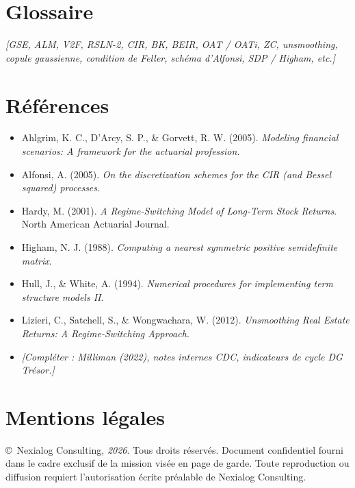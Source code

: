 \documentclass[11pt,a4paper]{article}
\newcommand{\ph}[1]{\textcolor{nxgray}{\itshape #1}}
\begin{document}
\section{Glossaire}
\ph{[GSE, ALM, V2F, RSLN-2, CIR, BK, BEIR, OAT / OATi, ZC, unsmoothing, copule gaussienne, condition de Feller, schéma d'Alfonsi, SDP / Higham, etc.]}

\section{Références}
\begin{itemize}
  \item Ahlgrim, K. C., D'Arcy, S. P., \& Gorvett, R. W. (2005). \textit{Modeling financial scenarios: A framework for the actuarial profession}.
  \item Alfonsi, A. (2005). \textit{On the discretization schemes for the CIR (and Bessel squared) processes}.
  \item Hardy, M. (2001). \textit{A Regime-Switching Model of Long-Term Stock Returns}. North American Actuarial Journal.
  \item Higham, N. J. (1988). \textit{Computing a nearest symmetric positive semidefinite matrix}.
  \item Hull, J., \& White, A. (1994). \textit{Numerical procedures for implementing term structure models II}.
  \item Lizieri, C., Satchell, S., \& Wongwachara, W. (2012). \textit{Unsmoothing Real Estate Returns: A Regime-Switching Approach}.
  \item \ph{[Compléter : Milliman (2022), notes internes CDC, indicateurs de cycle DG Trésor.]}
\end{itemize}

\section{Mentions légales}
\copyright~Nexialog Consulting, \ph{2026}. Tous droits réservés. Document confidentiel fourni dans le cadre exclusif de la mission visée en page de garde. Toute reproduction ou diffusion requiert l'autorisation écrite préalable de Nexialog Consulting.
\end{document}

